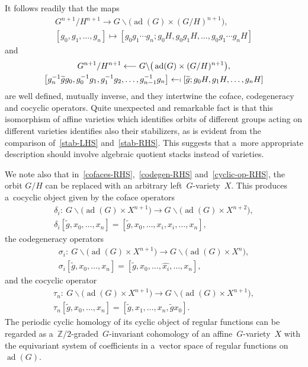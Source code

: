 \documentclass[pdftex]{sigma}
\numberwithin{equation}{section}
\DeclareMathOperator{\ad}{ad}
\begin{document}
It follows readily that the maps
\begin{gather}
G^{n+1}/H^{n+1}\longrightarrow G\backslash \big(\ad(G)\times (G/H)^{n+1}\big),
\nonumber
\\
[g_{0}, g_{1},\ldots, g_{n}]\mapsto \left[g_{0}g_{1}\cdots g_{n}; g_{0}H, g_{0}g_{1}H,\ldots, g_{0}g_{1}\cdots g_{n}H\right]
\label{cocyc-iso}
\end{gather}
and
\begin{gather}
G^{n+1}/H^{n+1}\longleftarrow G\backslash \big(\ad(G)\times (G/H)^{n+1}\big),
\nonumber
\\
\big[g_{n}^{-1}\widetilde{g}g_{0}, g_{0}^{-1}g_{1}, g_{1}^{-1}g_{2},\ldots, g_{n-1}^{-1}g_{n}\big]\leftarrow \shortmid
\left[\widetilde{g}; g_{0}H, g_{1}H,\ldots, g_{n}H\right]
\label{cocyc-iso-inv}
\end{gather}
are well def\/ined, mutually inverse, and they intertwine the coface, codegeneracy and cocyclic ope\-ra\-tors.
Quite unexpected and remarkable fact is that this isomorphism of af\/f\/ine varieties which identif\/ies orbits of dif\/ferent
groups acting on dif\/ferent varieties identif\/ies also their stabilizers, as is evident from the comparison
of~\eqref{stab-LHS} and~\eqref{stab-RHS}.
This suggests that a~more appropriate description should involve algebraic quotient stacks instead of varieties.

We note also that in~\eqref{cofaces-RHS},~\eqref{codegen-RHS} and~\eqref{cyclic-op-RHS}, the orbit $G/H$ can be replaced
with an arbitrary left~$G$-variety~$X$.
This produces a~cocyclic object given by the coface operators
\begin{gather}
\delta_{i}\colon \  G\backslash \big(\ad(G)\times X^{n+1}\big) \longrightarrow G\backslash \big(\ad(G)\times X^{n+2}\big),
\nonumber
\\
\delta_{i}[\widetilde{g}, x_{0},\ldots, x_{n}] =\left[\widetilde{g}, x_{0},\ldots, x_{i}, x_{i},\ldots, x_{n}\right],
\label{cofaces-X}
\end{gather}
the codegeneracy operators
\begin{gather}
\sigma_{i}\colon \ G\backslash \big(\ad(G)\times X^{n+1}\big) \longrightarrow G\backslash \big(\ad(G)\times X^{n}\big),
\nonumber
\\
\sigma_{i}[\widetilde{g}, x_{0},\ldots, x_{n}] =[\widetilde{g}, x_{0},\ldots,\widehat{x_{i}}, \ldots, x_{n}],
\label{codegen-X}
\end{gather}
and the cocyclic operator
\begin{gather}
\tau_{n}\colon \  G\backslash \big(\ad(G)\times X^{n+1}\big) \longrightarrow G\backslash \big(\ad(G)\times X^{n+1}\big),
\nonumber
\\
\tau_{n}[\widetilde{g}, x_{0},\ldots, x_{n}] = [\widetilde{g}, x_{1},\ldots, x_{n}, \widetilde{g} x_{0} ].
\label{cocyc-X}
\end{gather}
The periodic cyclic homology of its cyclic object of regular functions can be regarded as
a~$\mathbb{Z}/2$-graded~$G$-invariant cohomology of an af\/f\/ine~$G$-variety~$X$ with the equivariant system of
coef\/f\/i\-cients in a~vector space of regular functions on $\ad(G)$.
\end{document}

